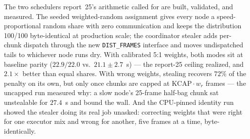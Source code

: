 \documentclass[
	english,
	letterpaper, oneside
]{article}
\begin{document}
The two schedulers report~25's arithmetic called for are built, validated,
and measured. The seeded weighted-random assignment gives every node a
speed-proportional random share with zero communication and keeps the
distribution 100/100 byte-identical at production scale; the coordinator
stealer adds per-chunk dispatch through the new \texttt{DIST\_FRAMES}
interface and moves undispatched tails to whichever node runs dry. With
calibrated 5:1 weights, both modes sit at baseline parity
($22.9/22.0$ vs.\ $21.1\pm2.7$~s) --- the report-25 ceiling realized, and
$2.1\times$ better than equal shares. With wrong weights, stealing recovers
$72\%$ of the penalty on its own, but only once chunks are capped at
$\mathrm{KCAP}\cdot w_r$ frames --- the uncapped run measured why: a slow
node's 25-frame half-bag chunk sat unstealable for $27.4$~s and bound the
wall. And the CPU-pinned identity run showed the stealer doing its real
job unasked: correcting weights that were right for one executor mix and
wrong for another, five frames at a time, byte-identically.
\end{document}
